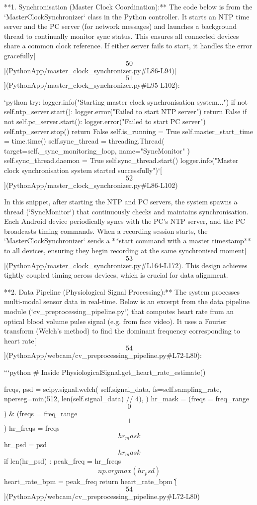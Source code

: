 \documentclass[12pt,a4paper]{article}
\begin{document}
{**1. Synchronisation (Master Clock Coordination):** The code below is
from the `MasterClockSynchronizer` class in the Python controller. It
starts an NTP time server and the PC server (for network messages) and
launches a background thread to continually monitor sync status. This
ensures all connected devices share a common clock reference. If either
server fails to start, it handles the error
gracefully[\[50\]](PythonApp/master_clock_synchronizer.py#L86-L94)[\[51\]](PythonApp/master_clock_synchronizer.py#L95-L102):

`python try: logger.info("Starting master clock synchronisation system...") if not self.ntp_server.start(): logger.error("Failed to start NTP server") return False if not self.pc_server.start(): logger.error("Failed to start PC server") self.ntp_server.stop() return False self.is_running = True self.master_start_time = time.time() self.sync_thread = threading.Thread( target=self._sync_monitoring_loop, name="SyncMonitor" ) self.sync_thread.daemon = True self.sync_thread.start() logger.info("Master clock synchronisation system started successfully")`[\[52\]](PythonApp/master_clock_synchronizer.py#L86-L102)

In this snippet, after starting the NTP and PC servers, the system
spawns a thread (`SyncMonitor`) that continuously checks and maintains
synchronisation. Each Android device periodically syncs with the PC's
NTP server, and the PC broadcasts timing commands. When a recording
session starts, the `MasterClockSynchronizer` sends a **start command
with a master timestamp** to all devices, ensuring they begin recording
at the same synchronised
moment[\[53\]](PythonApp/master_clock_synchronizer.py#L164-L172).
This design achieves tightly coupled timing across devices, which is
crucial for data alignment.

**2. Data Pipeline (Physiological Signal Processing):** The system
processes multi-modal sensor data in real-time. Below is an excerpt from
the data pipeline module (`cv_preprocessing_pipeline.py`) that computes
heart rate from an optical blood volume pulse signal (e.g. from face
video). It uses a Fourier transform (Welch's method) to find the
dominant frequency corresponding to heart
rate[\[54\]](PythonApp/webcam/cv_preprocessing_pipeline.py#L72-L80):

```python
# Inside PhysiologicalSignal.get_heart_rate_estimate()

freqs, psd = scipy.signal.welch( self.signal_data,
fs=self.sampling_rate, nperseg=min(512, len(self.signal_data) // 4), )
hr_mask = (freqs \>= freq_range\[0\]) & (freqs \<= freq_range\[1\])
hr_freqs = freqs\[hr_mask\] hr_psd = psd\[hr_mask\] if len(hr_psd) :
peak_freq = hr_freqs\[np.argmax(hr_psd)\] heart_rate_bpm = peak_freq  return heart_rate_bpm
\`\`\`[\[54\]](PythonApp/webcam/cv_preprocessing_pipeline.py#L72-L80)

}
\end{document}
